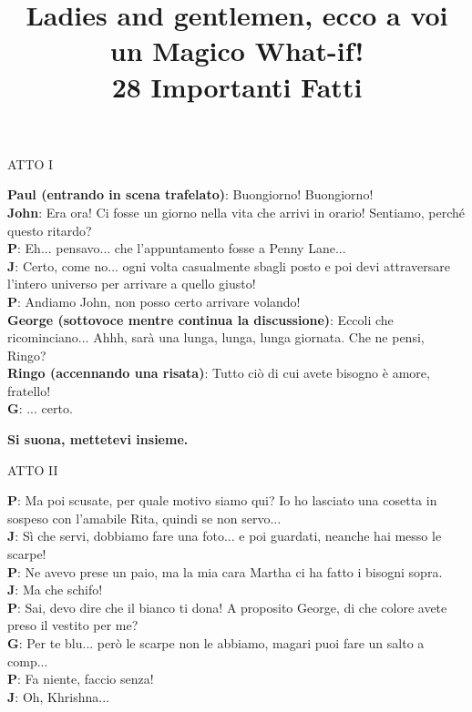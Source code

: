 \documentclass{article}
\title{
Ladies and gentlemen, ecco a voi un Magico What-if!\\\vspace{0.3cm}
\large 28 Importanti Fatti}
\date{}
\begin{document}
\maketitle
\begin{center}
{\large ATTO I\\}
\end{center}
{\bf Paul (entrando in scena trafelato)}: Buongiorno! Buongiorno!\\
{\bf John}: Era ora! Ci fosse un giorno nella vita che arrivi in orario! Sentiamo, perché questo ritardo?\\
{\bf P}: Eh... pensavo... che l'appuntamento fosse a Penny Lane...\\
{\bf J}: Certo, come no... ogni volta casualmente sbagli posto e poi devi attraversare l'intero universo per arrivare a quello giusto!\\
{\bf P}: Andiamo John, non posso certo arrivare volando!\\
{\bf George (sottovoce mentre continua la discussione)}: Eccoli che ricominciano... Ahhh, sarà una lunga, lunga, lunga giornata. Che ne pensi, Ringo?\\
{\bf Ringo (accennando una risata)}: Tutto ciò di cui avete bisogno è amore, fratello!\\
{\bf G}: ... certo.
\begin{center}
{\bf Si suona, mettetevi insieme.\\}
\end{center}
\vspace{0.3cm}
\begin{center}
{\large ATTO II\\}
\end{center}
{\bf P}: Ma poi scusate, per quale motivo siamo qui? Io ho lasciato una cosetta in sospeso con l'amabile Rita, quindi se non servo...\\
{\bf J}: Sì che servi, dobbiamo fare una foto... e poi guardati, neanche hai messo le scarpe!\\
{\bf P}: Ne avevo prese un paio, ma la mia cara Martha ci ha fatto i bisogni sopra.\\
{\bf J}: Ma che schifo!\\
{\bf P}: Sai, devo dire che il bianco ti dona! A proposito George, di che colore avete preso il vestito per me?\\
{\bf G}: Per te blu... però le scarpe non le abbiamo, magari puoi fare un salto a comp...\\
{\bf P}: Fa niente, faccio senza!\\
{\bf J}: Oh, Khrishna...\\
\end{document}
